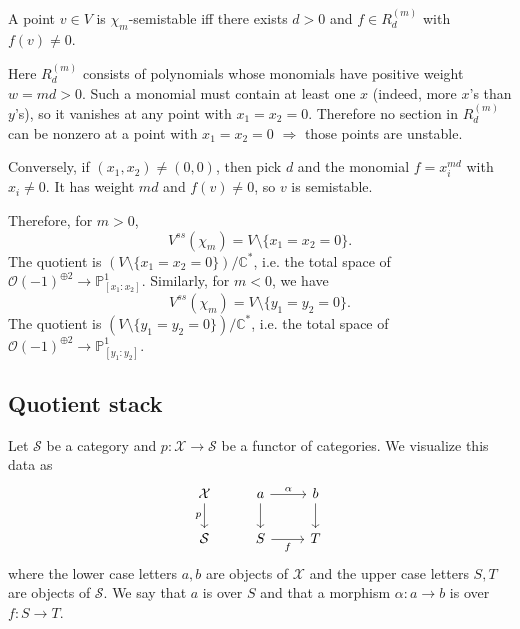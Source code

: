 \documentclass[12pt]{article}
\begin{document}
A point $v\in V$ is $\chi_m$-semistable iff there exists $d>0$ and $f\in R^{(m)}_d$ with $f(v)\ne 0$.

Here $R^{(m)}_d$ consists of polynomials whose monomials have positive weight $w=md>0$. Such a monomial must contain at least one $x$ (indeed, more $x$'s than $y$'s), so it vanishes at any point with $x_1=x_2=0$. Therefore no section in $R^{(m)}_d$ can be nonzero at a point with $x_1=x_2=0$ $\Rightarrow$ those points are unstable.

Conversely, if $(x_1,x_2)\neq(0,0)$, then pick $d$ and the monomial
$f=x_i^{md}$ with $x_i\neq 0$. It has weight $md$ and $f(v)\neq 0$, so $v$ is semistable.

Therefore, for $m>0$,
\[
V^{ss}(\chi_m)=V\setminus\{x_1=x_2=0\}.
\]
The quotient is $(V\setminus\{x_1=x_2=0\})/\mathbb{C}^*$, i.e. the total space of $\mathcal{O}(-1)^{\oplus 2}\to\mathbb{P}^1_{[x_1:x_2]}$. Similarly, for $m<0$, we have
\[
V^{ss}(\chi_m)=V\setminus\{y_1=y_2=0\}.
\]
The quotient is $(V\setminus\{y_1=y_2=0\})/\mathbb{C}^*$, i.e. the total space of $\mathcal{O}(-1)^{\oplus 2}\to\mathbb{P}^1_{[y_1:y_2]}$.

\subsection{Quotient stack}
Let $\mathcal{S}$ be a category and $p:\mathcal{X}\to\mathcal{S}$ be a functor of categories. 
We visualize this data as
\[
\begin{tikzcd}
\mathcal{X} \arrow[d, "p"'] & a \arrow[r, "\alpha"] \arrow[d] & b \arrow[d] \\
\mathcal{S} & S \arrow[r, "f"'] & T
\end{tikzcd}
\]
where the lower case letters $a,b$ are objects of $\mathcal{X}$ and the upper case letters $S,T$ 
are objects of $\mathcal{S}$. We say that $a$ is over $S$ and that a morphism $\alpha: a\to b$ is 
over $f:S\to T$.
\end{document}
